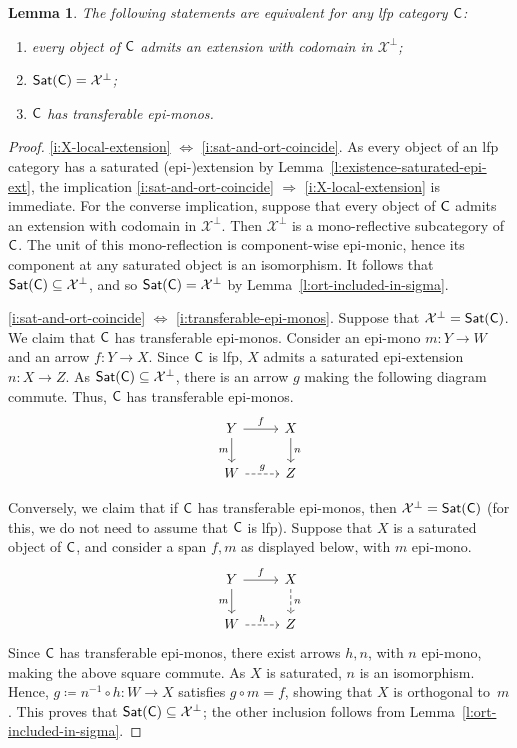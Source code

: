 \documentclass[10pt,a4paper]{amsart}
\newtheorem{lemma}{Lemma}
\newcommand{\IFF}{\Leftrightarrow}						%
\newcommand{\IMP}{\Rightarrow}						%
\newcommand{\Sat}{{\sf Sat}}								%
\newcommand{\X}{\ar{X}}									%
\newcommand{\ar}[1]{\mathcal{#1}}							%
\newcommand{\cat}{{\sf C}}								%
\newcommand{\ort}[1]{{#1}^{\perp}}						%
\begin{document}
\begin{lemma}\label{l:ort-vs-sat}
The following statements are equivalent for any lfp category $\cat$:
\begin{enumerate}[label=(\arabic*)]
\item\label{i:X-local-extension} every object of $\cat$ admits an extension with codomain in $\ort{\X}$;
\item\label{i:sat-and-ort-coincide} $\Sat(\cat)=\ort{\X}$;
\item\label{i:transferable-epi-monos} $\cat$ has transferable epi-monos.
\end{enumerate}
\end{lemma}

\begin{proof}
\ref{i:X-local-extension} $\IFF$ \ref{i:sat-and-ort-coincide}. As every object of an lfp category has a saturated (epi-)extension by Lemma~\ref{l:existence-saturated-epi-ext}, the implication \ref{i:sat-and-ort-coincide} $\IMP$ \ref{i:X-local-extension} is immediate. For the converse implication, suppose that every object of $\cat$ admits an extension with codomain in $\ort{\X}$. Then $\ort{\X}$ is a mono-reflective subcategory of $\cat$. The unit of this mono-reflection is component-wise epi-monic, hence its component at any saturated object is an isomorphism. It follows that $\Sat(\cat)\subseteq \ort{\X}$, and so $\Sat(\cat)=\ort{\X}$ by Lemma~\ref{l:ort-included-in-sigma}.

\ref{i:sat-and-ort-coincide} $\IFF$ \ref{i:transferable-epi-monos}.
Suppose that $\ort{\X} = \Sat(\cat)$. We claim that $\cat$ has transferable epi-monos. Consider an epi-mono $m\colon Y\to W$ and an arrow $f\colon Y\to X$. Since $\cat$ is lfp, $X$ admits a saturated epi-extension $n\colon X\to Z$. As $\Sat(\cat)\subseteq \ort{\X}$, there is an arrow $g$ making the following diagram commute. Thus, $\cat$ has transferable epi-monos.
\[\begin{tikzcd}
Y \arrow{d}[swap]{m} \arrow{r}{f} & X \arrow{d}{n} \\
W \arrow[dashed]{r}{g} & Z
\end{tikzcd}\]

Conversely, we claim that if $\cat$ has transferable epi-monos, then $\ort{\X} = \Sat(\cat)$ (for this, we do not need to assume that $\cat$ is lfp). 
%
Suppose that $X$ is a saturated object of $\cat$, and consider a span $f,m$ as displayed below, with $m$ epi-mono.
\[\begin{tikzcd}
Y \arrow{d}[swap]{m} \arrow{r}{f} & X \arrow[dashed]{d}{n} \\
W \arrow[dashed]{r}{h} & Z
\end{tikzcd}\]
Since $\cat$ has transferable epi-monos, there exist arrows $h,n$, with $n$ epi-mono, making the above square commute. As $X$ is saturated, $n$ is an isomorphism. Hence, $g\coloneqq n^{-1}\circ h\colon W\to X$ satisfies $g\circ m = f$, showing that $X$ is orthogonal to~$m$. This proves that $\Sat(\cat)\subseteq \ort{\X}$; the other inclusion follows from Lemma~\ref{l:ort-included-in-sigma}.
\end{proof}
\end{document}
